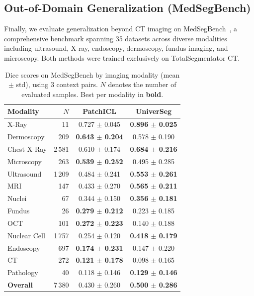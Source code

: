 \documentclass[10pt,twocolumn,letterpaper]{article}
\begin{document}
\subsection{Out-of-Domain Generalization (MedSegBench)}
\label{sec:ood_results}

Finally, we evaluate generalization beyond CT imaging on MedSegBench~\cite{kusMedSegBenchComprehensiveBenchmark2024}, a comprehensive benchmark spanning 35 datasets across diverse modalities including ultrasound, X-ray, endoscopy, dermoscopy, fundus imaging, and microscopy. Both methods were trained exclusively on TotalSegmentator CT.

\begin{table}[t]
\centering
\caption{Dice scores on MedSegBench by imaging modality (mean $\pm$ std), using 3 context pairs. $N$ denotes the number of evaluated samples. Best per modality in \textbf{bold}.}
\label{tab:medsegbench_category}
\small
\setlength{\tabcolsep}{3pt}
\begin{tabular}{@{}p{2.4cm}rcc@{}}
\toprule
Modality & $N$ & PatchICL & UniverSeg \\
\midrule
X-Ray           &     \phantom{0,0}11 & 0.727 $\pm$ 0.045 & \textbf{0.896 $\pm$ 0.025} \\
Dermoscopy      &  \phantom{0,}209 & \textbf{0.643 $\pm$ 0.204} & 0.578 $\pm$ 0.190 \\
Chest X-Ray     &          2\,581 & 0.610 $\pm$ 0.174 & \textbf{0.684 $\pm$ 0.216} \\
Microscopy      &  \phantom{0,}263 & \textbf{0.539 $\pm$ 0.252} & 0.495 $\pm$ 0.285 \\
Ultrasound      &          1\,209 & 0.484 $\pm$ 0.241 & \textbf{0.553 $\pm$ 0.261} \\
MRI             &  \phantom{0,}147 & 0.433 $\pm$ 0.270 & \textbf{0.565 $\pm$ 0.211} \\
Nuclei          &   \phantom{0,0}67 & 0.344 $\pm$ 0.150 & \textbf{0.356 $\pm$ 0.181} \\
Fundus          &   \phantom{0,0}26 & \textbf{0.279 $\pm$ 0.212} & 0.223 $\pm$ 0.185 \\
OCT             &  \phantom{0,}101 & \textbf{0.272 $\pm$ 0.223} & 0.140 $\pm$ 0.188 \\
Nuclear Cell    &          1\,757 & 0.254 $\pm$ 0.120 & \textbf{0.418 $\pm$ 0.179} \\
Endoscopy       &  \phantom{0,}697 & \textbf{0.174 $\pm$ 0.231} & 0.147 $\pm$ 0.220 \\
CT              &  \phantom{0,}272 & \textbf{0.121 $\pm$ 0.178} & 0.098 $\pm$ 0.165 \\
Pathology       &   \phantom{0,0}40 & 0.118 $\pm$ 0.146 & \textbf{0.129 $\pm$ 0.146} \\
\midrule
\textbf{Overall} &         7\,380 & 0.430 $\pm$ 0.260 & \textbf{0.500 $\pm$ 0.286} \\
\bottomrule
\end{tabular}
\end{table}
\end{document}
